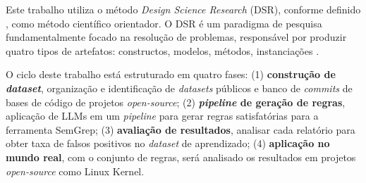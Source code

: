 \documentclass[
    12pt,                %
    openright,           %
    oneside,             %
    a4paper,             %
    english,             %
    brazil               %
]{abntex2}
\begin{document}
\par
Este trabalho utiliza o método \textit{Design Science Research} (DSR), conforme definido , como método científico orientador.
O DSR é um paradigma de pesquisa fundamentalmente focado na resolução de problemas, responsável por produzir quatro tipos de artefatos: constructos, modelos, métodos, instanciações \cite{hevner2004design}.
\par
O ciclo deste trabalho está estruturado em quatro fases:
(1) \textbf{construção de \textit{dataset}}, organização e identificação de \textit{datasets} públicos e banco de \textit{commits} de bases de código de projetos \textit{open-source};
(2) \textbf{\textit{pipeline} de geração de regras}, aplicação de LLMs em um \textit{pipeline} para gerar regras satisfatórias para a ferramenta SemGrep;
(3) \textbf{avaliação de resultados}, analisar cada relatório para obter taxa de falsos positivos no \textit{dataset} de aprendizado;
(4) \textbf{aplicação no mundo real}, com o conjunto de regras, será analisado os resultados em projetos \textit{open-source} como Linux Kernel.
\end{document}
